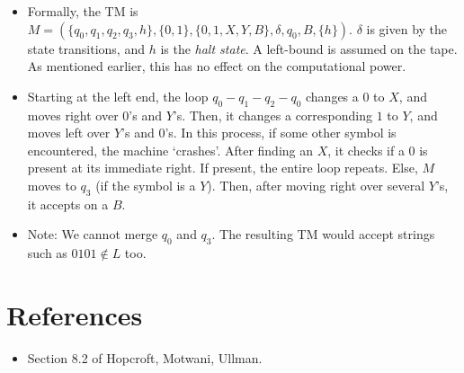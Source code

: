 \documentclass{article}
\newcommand{\I}[1]{\textit{#1}}
\begin{document}
\begin{sloppypar}
\begin{itemize}
        \begin{itemize}
            \item Formally, the TM is $M=(\{q_0,q_1,q_2,q_3,h\},\{0,1\},\{0,1,X,Y,B\},\delta,q_0,B,\{h\})$. $\delta$ is given by the state transitions, and $h$ is the \I{halt state}. A left-bound is assumed on the tape. As mentioned earlier, this has no effect on the computational power.
            \item Starting at the left end, the loop $q_0-q_1-q_2-q_0$ changes a $0$ to $X$, and moves right over $0$'s and $Y$'s. Then, it changes a corresponding $1$ to $Y$, and moves left over $Y$'s and $0$'s. In this process, if some other symbol is encountered, the machine `crashes'. After finding an $X$, it checks if a $0$ is present at its immediate right. If present, the entire loop repeats. Else, $M$ moves to $q_3$ (if the symbol is a $Y$). Then, after moving right over several $Y$'s, it accepts on a $B$.
            \item Note: We cannot merge $q_0$ and $q_3$. The resulting TM would accept strings such as $0101\notin L$ too.
        \end{itemize}

    \end{itemize}

    \section{References}
    \begin{itemize}
        \item Section 8.2 of Hopcroft, Motwani, Ullman.
    \end{itemize}

\end{sloppypar}
\end{document}
